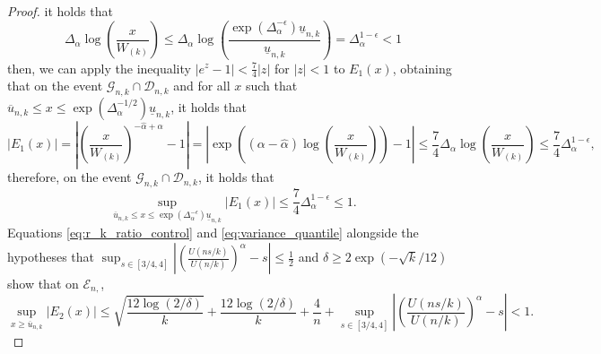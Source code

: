 \documentclass{article}
\numberwithin{equation}{section}
\begin{document}
\begin{proof}
    it holds that
    \begin{equation*}
        \Delta_{\alpha}\log\left(\frac{x}{W_{(k)}}\right)\leq
        \Delta_{\alpha}\log\left(\frac{\exp{\left(\Delta_\alpha^{-\epsilon}\right)}\underline{u}_{n,k}}{\underline{u}_{n,k}}\right)
        = \Delta_{\alpha}^{1-\epsilon}<1       
    \end{equation*}
    then, we can apply the inequality \(|e^z-1|<\frac{7}{4}|z|\)
    for \(|z|<1\) \cite[pp.82]{bullen1998dictionary} to \(E_1(x)\),
    obtaining that on the event
    \(\mathcal{G}_{n,k}\cap\mathcal{D}_{n,k}\) and for all \(x\)
    such that \(\overline{u}_{n,k}\leq x\leq
    \exp{\left(\Delta_\alpha^{-1/2}\right)}\underline{u}_{n,k}\),
    it holds that
    \begin{equation*}
        |E_1(x)| = \left|\left(\frac{x}{W_{(k)}}\right)^{-\widehat
        \alpha+\alpha}
        -1\right|=\left|\exp{\left(\left(\alpha-\widehat{\alpha}\right)\log\left(\frac{x}{W_{(k)}}\right)\right)}-1\right|\leq
        \frac{7}{4}\Delta_{\alpha}\log\left(\frac{x}{W_{(k)}}\right)\leq
        \frac{7}{4} \Delta_{\alpha}^{1-\epsilon},
    \end{equation*}
    therefore, on the event
    \(\mathcal{G}_{n,k}\cap\mathcal{D}_{n,k}\), it holds that
    \begin{equation}\label{eq:control_E_1}
        \sup_{\overline{u}_{n,k}\leq x\leq
        \exp{\left(\Delta_\alpha^{-\epsilon}\right)}\underline{u}_{n,k}}{\left|
        E_1(x) \right| } \leq \frac{7}{4}
        \Delta_{\alpha}^{1-\epsilon}\leq 1.
    \end{equation}
    Equations \eqref{eq:r_k_ratio_control} and
    \eqref{eq:variance_quantile} alongside the hypotheses
    that
    \(\sup_{s\in[3/4,4]}{\left|\left(\frac{U(ns/k)}{U(n/k)}\right)^{\alpha}-s\right|}\leq
    \frac{1}{2}\)
    and \(\delta\geq
    2\exp{\left(-\sqrt{k}/12\right)}\) show
    that on \(\mathcal{E}_{n,}\),
    \begin{equation}\label{eq:control_E_2}
        \sup_{x\geq \overline{u}_{n,k}} |E_2(x)|\leq
        \sqrt{\frac{12\log(2/\delta)}{k}} +
        \frac{12\log(2/\delta)}{k} + \frac{4}{n} +
        \sup_{s\in[3/4,4]}{\left|\left(\frac{U(ns/k)}{U(n/k)}\right)^{\alpha}-s\right|}
        < 1.
    \end{equation}


\end{proof}
\end{document}
